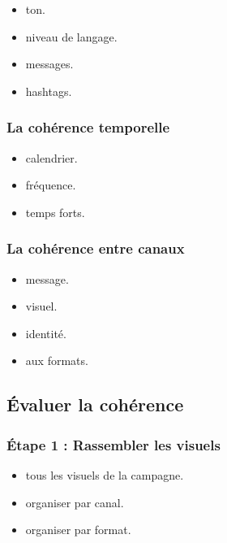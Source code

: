 \begin{itemize}
    \item {} ton.
    \item {} niveau de langage.
    \item {} messages.
    \item {} hashtags.
\end{itemize}

\subsubsection{La cohérence temporelle}

\begin{itemize}
    \item {} calendrier.
    \item {} fréquence.
    \item {} temps forts.
\end{itemize}

\subsubsection{La cohérence entre canaux}

\begin{itemize}
    \item {} message.
    \item {} visuel.
    \item {} identité.
    \item {} aux formats.
\end{itemize}

\subsection{Évaluer la cohérence}

\subsubsection{Étape 1 : Rassembler les visuels}

\begin{itemize}
    \item {} tous les visuels de la campagne.
    \item {} organiser par canal.
    \item {} organiser par format.
\end{itemize}

